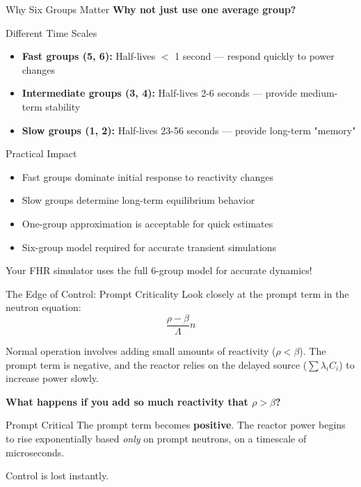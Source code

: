 \documentclass[aspectratio=169]{beamer}
\begin{document}
\begin{frame}[allowframebreaks]{Why Six Groups Matter}
    \textbf{Why not just use one average group?}

    \vspace{1em}
    \begin{block}{Different Time Scales}
        \begin{itemize}
            \item \textbf{Fast groups (5, 6):} Half-lives $<$ 1 second — respond quickly to power changes
            \item \textbf{Intermediate groups (3, 4):} Half-lives 2-6 seconds — provide medium-term stability
            \item \textbf{Slow groups (1, 2):} Half-lives 23-56 seconds — provide long-term "memory"
        \end{itemize}
    \end{block}

    \vspace{1em}
    \begin{exampleblock}{Practical Impact}
        \begin{itemize}
            \item Fast groups dominate initial response to reactivity changes
            \item Slow groups determine long-term equilibrium behavior
            \item One-group approximation is acceptable for quick estimates
            \item Six-group model required for accurate transient simulations
        \end{itemize}
    \end{exampleblock}

    \vspace{1em}
    Your FHR simulator uses the full 6-group model for accurate dynamics!
\end{frame}

\begin{frame}[allowframebreaks]{The Edge of Control: Prompt Criticality}
    Look closely at the prompt term in the neutron equation:
    $$ \frac{\rho - \beta}{\Lambda}n $$

    Normal operation involves adding small amounts of reactivity ($\rho < \beta$). The prompt term is negative, and the reactor relies on the delayed source ($\sum \lambda_i C_i$) to increase power slowly.

    \vspace{1em}
    \textbf{What happens if you add so much reactivity that $\rho > \beta$?}

    \begin{alertblock}{Prompt Critical}
        The prompt term becomes \textbf{positive}. The reactor power begins to rise exponentially based \textit{only} on prompt neutrons, on a timescale of microseconds.
        
        Control is lost instantly.
    \end{alertblock}
\end{frame}
\end{document}
